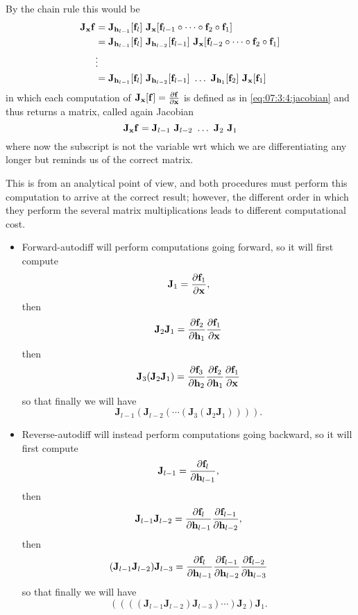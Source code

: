 By the chain rule this would be
\begin{equation}
    \begin{aligned}
        \mathbf{J}_{\vb{x}} \vb{f} & = \mathbf{J}_{\vb{h}_{l-1}} [\vb{f}_{l}] ~ \mathbf{J}_{\vb{x}} [\vb{f}_{l-1} \circ \dots \circ \vb{f}_2 \circ \vb{f}_1] \\
        & = \mathbf{J}_{\vb{h}_{l-1}} [\vb{f}_{l}] ~ \mathbf{J}_{\vb{h}_{l-2}} [\vb{f}_{l-1}] ~ \mathbf{J}_{\vb{x}} [\vb{f}_{l-2} \circ \dots \circ \vb{f}_2 \circ \vb{f}_1] \\
        & \vdots \\
        & = \mathbf{J}_{\vb{h}_{l-1}} [\vb{f}_{l}] ~ \mathbf{J}_{\vb{h}_{l-2}} [\vb{f}_{l-1}] ~ \dots ~ \mathbf{J}_{\vb{h}_1} [\vb{f}_2] ~ \mathbf{J}_{\vb{x}}[\vb{f}_1]
    \end{aligned}
\end{equation}
in which each computation of $\vb{J}_{\vb{x}} [\vb{f}] = \pdv{\vb{f}}{\vb{x}}$ is defined as in \cref{eq:07:3:4:jacobian} and thus returns a matrix, called again Jacobian
\begin{equation}
    \mathbf{J}_{\vb{x}} \vb{f} = \mathbf{J}_{l-1} ~ \mathbf{J}_{l-2} ~ \dots ~ \mathbf{J}_2 ~ \mathbf{J}_1
\end{equation}
where now the subscript is not the variable wrt which we are differentiating any longer but reminds us of the correct matrix.

This is from an analytical point of view, and both procedures must perform this computation to arrive at the correct result; however, the different order in which they perform the several matrix multiplications leads to different computational cost.

\begin{itemize}
    \item Forward-autodiff will perform computations going forward, so it will first compute 
    $$\vb{J}_1 = \pdv{\vb{f}_1}{\vb{x}},$$
    then 
    $$\vb{J}_2 \vb{J}_1 = \pdv{\vb{f}_2}{\vb{h}_1} \pdv{\vb{f}_1}{\vb{x}}$$
    then
    $$\vb{J}_3(\vb{J}_2 \vb{J}_1) = \pdv{\vb{f}_3}{\vb{h}_2} \pdv{\vb{f}_2}{\vb{h}_1} \pdv{\vb{f}_1}{\vb{x}}$$
    so that finally we will have
    \begin{equation}
        \mathbf{J}_{l-1} ( \mathbf{J}_{l-2} (\cdots (\mathbf{J}_{3}(\mathbf{J}_{2}\mathbf{J}_{1})))).
    \end{equation}

    \item Reverse-autodiff will instead perform computations going backward, so it will first compute
    $$\vb{J}_{l-1} = \pdv{\vb{f}_l}{\vb{h}_{l-1}},$$
    then
    $$\vb{J}_{l-1} \vb{J}_{l-2} = \pdv{\vb{f}_l}{\vb{h}_{l-1}} \pdv{\vb{f}_{l-1}}{\vb{h}_{l-2}},$$
    then
    $$(\vb{J}_{l-1} \vb{J}_{l-2}) \vb{J}_{l-3} = \pdv{\vb{f}_l}{\vb{h}_{l-1}} \pdv{\vb{f}_{l-1}}{\vb{h}_{l-2}} \pdv{\vb{f}_{l-2}}{\vb{h}_{l-3}}$$
    so that finally we will have
    \begin{equation}
        (((( \mathbf{J}_{l-1} \mathbf{J}_{l-2}) \mathbf{J}_{l-3})\cdots)\mathbf{J}_{2})\mathbf{J}_{1}.
    \end{equation}
\end{itemize}

